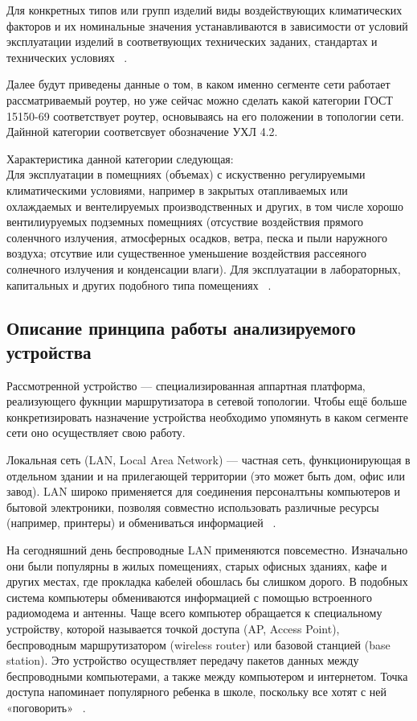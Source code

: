 Для конкретных типов или групп изделий виды воздействующих
климатических факторов и их номинальные значения устанавливаются в
зависимости от условий эксплуатации изделий в соответвующих
технических заданих, стандартах и технических условиях ~\cite{GOST_15150-69}.

Далее будут приведены данные о том, в каком именно сегменте сети
работает рассматриваемый роутер, но уже сейчас можно сделать какой
категории ГОСТ 15150-69 соответствует роутер, основываясь на его
положении в топологии сети. Дайнной категории соответсвует обозначение
УХЛ 4.2.

Характеристика данной категории следующая:\\
Для эксплуатации в помещниях (объемах) с искуственно регулируемыми
климатическими условиями, например в закрытых отапливаемых или
охлаждаемых и вентелируемых производственных и других, в том числе
хорошо вентилиуруемых подземных помещниях (отсуствие воздействия
прямого соленчного излучения, атмосферных осадков, ветра, песка и пыли
наружного воздуха; отсутвие или существенное уменьшение воздействия
рассеяного солнечного излучения и конденсации влаги). Для эксплуатации
в лабораторных, капитальных и других подобного типа помещениях ~\cite{GOST_15150-69}.

\subsection{Описание принципа работы анализируемого устройства}


Рассмотренной устройство — специализированная аппартная платформа,
реализующего фукнции маршрутизатора в сетевой топологии.  Чтобы ещё
больше конкретизировать назначение устройства необходимо упомянуть в
каком сегменте сети оно осуществляет свою работу.


Локальная сеть (LAN, Local Area Network) — частная сеть,
функционирующая в отдельном здании и на прилегающей территории
(это может быть дом, офис или завод). LAN широко применяется для соединения персоналтьны компьютеров и бытовой электроники, позволяя совместно
использовать различные ресурсы (например, принтеры) и обмениваться
информацией ~\cite{NetworksTanenbaum2023}.

На сегодняшний день беспроводные LAN применяются
повсеместно. Изначально они были популярны в жилых помещениях, старых
офисных зданиях, кафе и других местах, где прокладка кабелей обошлась
бы слишком дорого. В подобных система компьютеры обмениваются
информацией с помощью встроенного радиомодема и антенны. Чаще всего
компьютер обращается к специальному устройству, которой называется
точкой доступа (AP, Access Point), беспроводным маршрутизатором
(wireless router) или базовой станцией (base station). Это устройство
осуществляет передачу пакетов данных между беспроводными компьютерами,
а также между компьютером и интернетом. Точка доступа напоминает
популярного ребенка в школе, поскольку все хотят с ней «поговорить»
~\cite{NetworksTanenbaum2023}.


